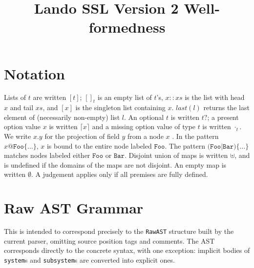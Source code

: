 \documentclass{article}
\begin{document}
\title{Lando SSL Version 2 Well-formedness}
\maketitle

\section{Notation}

\newcommand{\nt}[1]{\ensuremath{\mathit{#1}}}
\newcommand{\lab}[1]{\ensuremath{\texttt{#1}}}
\newcommand{\listof}[1]{\ensuremath{[{#1}]}}
\newcommand{\nillist}[1]{[]_{#1}}
\newcommand{\conslist}[2]{{#1}::{#2}}
\newcommand{\singlelist}[1]{[{#1}]}
\newcommand{\listlast}[1]{\mathit{last}({#1})}
\newcommand{\optof}[1]{\ensuremath{{#1}?}}
\newcommand{\some}[1]{\lceil{#1}\rceil}
\newcommand{\none}[1]{\cdot_{#1}}
\newcommand{\proj}[2]{\ensuremath{{#1}.{#2}}}
\newcommand{\emptym}{\emptyset} 

Lists of $t$ are written $\listof{t}$; $\nillist{t}$ is an empty list of $t$'s, $\conslist{x}{xs}$ is the list with head $x$ and tail $xs$,
and $\singlelist{x}$ is the singleton list containing $x$.
$\listlast{l}$ returns the last element of (necessarily non-empty) list $l$.
An optional $t$ is written $\optof{t}$; a present option value $x$ is written $\some{x}$ and a missing option value of type $t$ is written $\none{t}$.
We write $\proj{x}{y}$ for the projection of field $y$ from a node $x$ .
In the pattern $x@\lab{Foo}\{\ldots\}$, $x$ is bound to the entire node labeled $\lab{Foo}$.
The pattern $\lab{(Foo|Bar)}\{\ldots\}$ matches nodes labeled either $\lab{Foo}$ or $\lab{Bar}$.
Disjoint union of maps is written $\uplus$, and is undefined if the domains of the maps are not disjoint.  An empty map is written $\emptym$.
A judgement applies only if all premises are fully defined.
\section{Raw AST Grammar}

This is intended to correspond precisely to the {\tt RawAST} structure built by the current parser, omitting source position tags
and comments. The AST corresponds directly to the concrete syntax, with one exception: implicit bodies of {\tt system}s and {\tt subsystem}s are
converted into explicit ones. 
\end{document}
